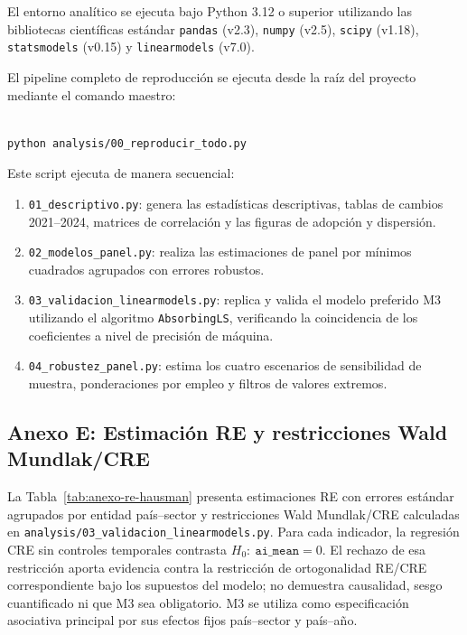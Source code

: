 \documentclass[12pt,a4paper]{article}
\begin{document}
El entorno analítico se ejecuta bajo Python 3.12 o superior utilizando las bibliotecas científicas estándar \texttt{pandas} (v2.3), \texttt{numpy} (v2.5), \texttt{scipy} (v1.18), \texttt{statsmodels} (v0.15) y \texttt{linearmodels} (v7.0).

El pipeline completo de reproducción se ejecuta desde la raíz del proyecto mediante el comando maestro:

\begin{verbatim}

python analysis/00_reproducir_todo.py

\end{verbatim}

Este script ejecuta de manera secuencial:

\begin{enumerate}

    \item \texttt{01\_descriptivo.py}: genera las estadísticas descriptivas, tablas de cambios 2021--2024, matrices de correlación y las figuras de adopción y dispersión.

    \item \texttt{02\_modelos\_panel.py}: realiza las estimaciones de panel por mínimos cuadrados agrupados con errores robustos.

    \item \texttt{03\_validacion\_linearmodels.py}: replica y valida el modelo preferido M3 utilizando el algoritmo \texttt{AbsorbingLS}, verificando la coincidencia de los coeficientes a nivel de precisión de máquina.

    \item \texttt{04\_robustez\_panel.py}: estima los cuatro escenarios de sensibilidad de muestra, ponderaciones por empleo y filtros de valores extremos.

\end{enumerate}

\subsection*{Anexo E: Estimación RE y restricciones Wald Mundlak/CRE}

\label{anexo:re-hausman}

La Tabla~\ref{tab:anexo-re-hausman} presenta estimaciones RE con errores estándar agrupados por entidad país--sector y restricciones Wald Mundlak/CRE calculadas en \texttt{analysis/03\_validacion\_linearmodels.py}. Para cada indicador, la regresión CRE sin controles temporales contrasta $H_0:\ \texttt{ai\_mean}=0$. El rechazo de esa restricción aporta evidencia contra la restricción de ortogonalidad RE/CRE correspondiente bajo los supuestos del modelo; no demuestra causalidad, sesgo cuantificado ni que M3 sea obligatorio. M3 se utiliza como especificación asociativa principal por sus efectos fijos país--sector y país--año.
\end{document}
